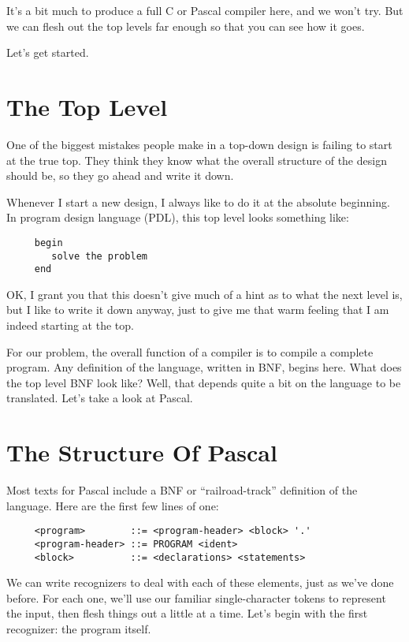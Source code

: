 It's  a bit much to produce a full C or Pascal compiler here, and we won't try. But we can flesh out the top levels far enough so that you can see how it goes.

Let's get started.

\section{The Top Level}

One of the biggest  mistakes  people make in a top-down design is failing  to start at the true top. They think they know what the overall structure of the  design  should be, so they go ahead and write it down.

Whenever  I  start a new design, I always like to do  it  at  the absolute beginning. In  program design language (PDL), this top level looks something like:

\begin{verbatim}
     begin
        solve the problem
     end
\end{verbatim}

OK, I grant  you that this doesn't give much of a hint as to what the next level is, but I  like  to  write it down anyway, just to give me that warm feeling that I am indeed starting at the top.

For our problem, the overall function of a compiler is to compile a complete program. Any definition of the  language, written in BNF, begins here. What does the top level BNF look like?  Well, that depends quite a bit on the language to be translated. Let's take a look at Pascal.

\section{The Structure Of Pascal}

Most  texts  for  Pascal  include  a   BNF   or ``railroad-track'' definition of the language. Here are the first few lines of one:

\begin{verbatim}
     <program>        ::= <program-header> <block> '.'
     <program-header> ::= PROGRAM <ident>
     <block>          ::= <declarations> <statements>
\end{verbatim}


We can write recognizers  to  deal  with  each of these elements, just as we've done before. For each one, we'll use  our familiar single-character tokens to represent the input, then flesh things out a little at a time. Let's begin with the first recognizer: the program itself.

